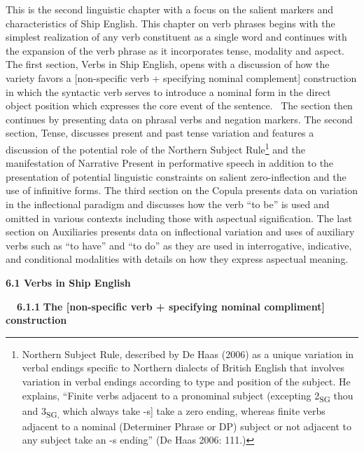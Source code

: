 \begin{styleStandard}
This is the second linguistic chapter with a focus on the salient markers and characteristics of Ship English. This chapter on verb phrases begins with the simplest realization of any verb constituent as a single word and continues with the expansion of the verb phrase as it incorporates tense, modality and aspect. The first section, Verbs in Ship English, opens with a discussion of how the variety favors a [non-specific verb + specifying nominal complement] construction in which the syntactic verb serves to introduce a nominal form in the direct object position which expresses the core event of the sentence. \ The section then continues by presenting data on phrasal verbs and negation markers. The second section, Tense, discusses present and past tense variation and features a discussion of the potential role of the Northern Subject Rule\footnote{ Northern Subject Rule, described by De Haas (2006) as a unique variation in verbal endings specific to Northern dialects of British English that involves variation in verbal endings according to type and position of the subject. He explains, “Finite verbs adjacent to a pronominal subject (excepting 2\textsubscript{SG }thou and 3\textsubscript{SG, }which always take -s] take a zero ending, whereas finite verbs adjacent to a nominal (Determiner Phrase or DP) subject or not adjacent to any subject take an -s ending” (De Haas 2006: 111.)} and the manifestation of Narrative Present in performative speech in addition to the presentation of potential linguistic constraints on salient zero-inflection and the use of infinitive forms. The third section on the Copula presents data on variation in the inflectional paradigm and discusses how the verb “to be” is used and omitted in various contexts including those with aspectual signification. The last section on Auxiliaries presents data on inflectional variation and uses of auxiliary verbs such as “to have” and “to do” as they are used in interrogative, indicative, and conditional modalities with details on how they express aspectual meaning. 
\end{styleStandard}

\begin{styleStandard}
\textbf{6.1 Verbs in Ship English}
\end{styleStandard}

\begin{styleStandard}
\textbf{\ \ 6.1.1} \textbf{The [non-specific verb + specifying nominal compliment] construction}
\end{styleStandard}

